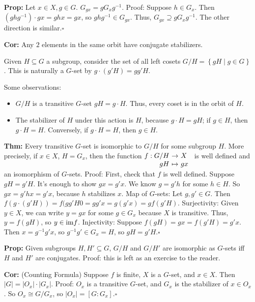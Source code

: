 \documentclass[10pt,letterpaper]{article}
\newcommand{\n}{\hfill\break}
\newcommand{\hangblock}[2]{\par\noindent\settowidth{\hangindent}{\textbf{#1: }}\textbf{#1: }\!\!\!#2}
\newcommand{\thm}[1]{\hangblock{Thm}{#1}}
\newcommand{\cor}[1]{\hangblock{Cor}{#1}}
\newcommand{\prop}[1]{\hangblock{Prop}{#1}}
\newcommand{\proven}{\;$\square$\n}
\newcommand{\card}[1]{\left|#1\right|}
\newcommand{\set}[1]{\left\{#1\right\}}
\newcommand{\inv}{^{-1}}
\newcommand{\map}[4]{\!\!\!\begin{array}[t]{rcl}#1 & \!\!\!\!\to & \!\!\!\!#2\\ #3 & \!\!\!\!\mapsto & \!\!\!\!#4\end{array}}
\newcommand{\im}{\textrm{\textnormal{im}}}
\begin{document}
\prop{
	Let $x\in{}X,g\in{}G$. $G_{gx}=gG_{x}g\inv$.\n
	Proof: Suppose $h\in{}G_{x}$. Then $(ghg\inv)\cdot{}gx=ghx=gx$, so $ghg\inv\in{}G_{gx}$. Thus, $G_{gx}\supseteq{}gG_{x}g\inv$.\n
	The other direction is similar.\proven
}

\cor{
	Any $2$ elements in the same orbit have conjugate stabilizers.\n
}

\par\noindent
Given $H\subseteq{}G$ a subgroup, consider the set of all left cosets $G/H=\set{gH\mid{}g\in{}G}$. This is naturally a $G$-set by $g\cdot(g'H)=gg'H$.\n

\par\noindent
Some observations:
\begin{itemize}
	\item $G/H$ is a transitive $G$-set $gH=g\cdot{}H$. Thus, every coset is in the orbit of $H$.
	\item The stabilizer of $H$ under this action is $H$, because $g\cdot{}H=gH$; if $g\in{}H$, then $g\cdot{}H=H$. Conversely, if $g\cdot{}H=H$, then $g\in{}H$.
\end{itemize}

\thm{
	Every transitive $G$-set is isomorphic to $G/H$ for some subgroup $H$. More precisely, if $x\in{}X$, $H=G_{x}$, then the function $\map{f:G/H}{X}{gH}{gx}$ is well defined and an isomorphism of $G$-sets.\n
	Proof: First, check that $f$ is well defined. Suppose $gH=g'H$. It's enough to show $gx=g'x$. We know $g=g'h$ for some $h\in{}H$. So $gx=g'hx=g'x$, because $h$ stabilizes $x$.\n
	Map of $G$-sets: Let $g,g'\in{}G$. Then $f(g\cdot(g'H))=f(gg'H0=gg'x=g(g'x)=gf(g'H)$.\n
	Surjectivity: Given $y\in{}X$, we can write $y=gx$ for some $g\in{}G_{x}$ because $X$ is transitive. Thus, $y=f(gH)$, so $y\in\im{}f$.\n
	Injectivity: Suppose $f(gH)=gx=f(g'H)=g'x$. Then $x=g\inv{}g'x$, so $g\inv{}g'\in{}G_{x}=H$, so $gH=g'H$.\proven
}

\prop{
	Given subgroups $H,H'\subseteq{}G$, $G/H$ and $G/H'$ are isomorphic as $G$-sets iff $H$ and $H'$ are conjugates.\n
	Proof: this is left as an exercise to the reader.\n
}

\cor{
	(Counting Formula) Suppose $f$ is finite, $X$ is a $G$-set, and $x\in{}X$. Then $\card{G}=\card{O_{x}}\cdot\card{G_{x}}$.\n
	Proof: $O_{x}$ is a transitive $G$-set, and $G_{x}$ is the stabilizer of $x\in{}O_{x}$. So $O_{x}\cong{}G/G_{x}$, so $\card{O_{x}}=[G:G_{x}]$.\proven
}
\end{document}
